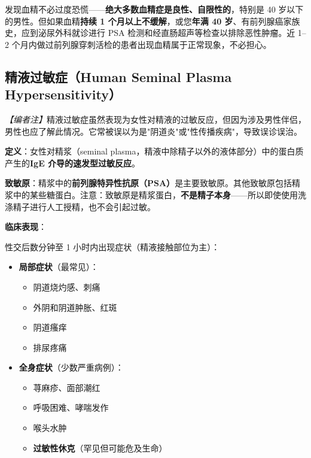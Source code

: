 \begin{enumerate}
\begin{tcolorbox}[colback=pink!5!white,colframe=red!50!black,title=贴心小叮咛]
发现血精不必过度恐慌——\textbf{绝大多数血精症是良性、自限性的}，特别是 40 岁以下的男性。但如果血精\textbf{持续 1 个月以上不缓解}，或您\textbf{年满 40 岁}、有前列腺癌家族史，应到泌尿外科就诊进行 PSA 检测和经直肠超声等检查以排除恶性肿瘤。近 1--2 个月内做过前列腺穿刺活检的患者出现血精属于正常现象，不必担心。
\end{tcolorbox}

\subsection{精液过敏症（Human Seminal Plasma Hypersensitivity）}
\label{subsec:seminal_allergy}

\noindent\textit{【编者注】}精液过敏症虽然表现为女性对精液的过敏反应，但因为涉及男性伴侣，男性也应了解此情况。它常被误以为是"阴道炎"或"性传播疾病"，导致误诊误治。

\vspace{0.5em}
\noindent\textbf{定义}：女性对精浆（seminal plasma，精液中除精子以外的液体部分）中的蛋白质产生的\textbf{IgE 介导的速发型过敏反应}。

\vspace{0.5em}
\noindent\textbf{致敏原}：精浆中的\textbf{前列腺特异性抗原（PSA）}是主要致敏原。其他致敏原包括精浆中的某些糖蛋白。注意：致敏原是精浆蛋白，\textbf{不是精子本身}——所以即使使用洗涤精子进行人工授精，也不会引起过敏。

\vspace{0.5em}
\noindent\textbf{临床表现}：

性交后数分钟至 1 小时内出现症状（精液接触部位为主）：
\begin{itemize}[leftmargin=2cm]
	\item \textbf{局部症状}（最常见）：
	\begin{itemize}
		\item 阴道烧灼感、刺痛
		\item 外阴和阴道肿胀、红斑
		\item 阴道瘙痒
		\item 排尿疼痛
	\end{itemize}
	\item \textbf{全身症状}（少数严重病例）：
	\begin{itemize}
		\item 荨麻疹、面部潮红
		\item 呼吸困难、哮喘发作
		\item 喉头水肿
		\item \textbf{过敏性休克}（罕见但可能危及生命）
	\end{itemize}
\end{itemize}


\end{enumerate}
